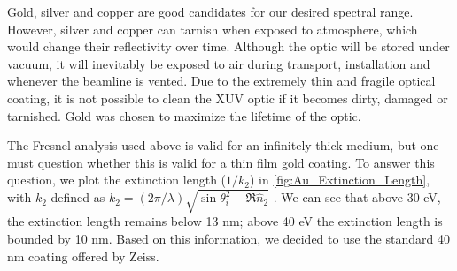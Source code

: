 Gold, silver and copper are good candidates for our desired spectral range. However, silver and copper can tarnish when exposed to atmosphere, which would change their reflectivity over time. Although the optic will be stored under vacuum, it will inevitably be exposed to air during transport, installation and whenever the beamline is vented. Due to the extremely thin and fragile optical coating, it is not possible to clean the XUV optic if it becomes dirty, damaged or tarnished. Gold was chosen to maximize the lifetime of the optic.

The Fresnel analysis used above is valid for an infinitely thick medium, but one must question whether this is valid for a thin film gold coating. To answer this question, we plot the extinction length ($1/k_2$) in \cref{fig:Au_Extinction_Length}, with $k_2$ defined as ${ k_2 = \left( 2 \pi / \lambda \right) \sqrt{ \sin \theta_i^2 - \Re\hat{n}_2} }$ \cite{zangwillModernElectrodynamics2013}. We can see that above 30 eV, the extinction length remains below 13 nm; above 40 eV the extinction length is bounded by 10 nm. Based on this information, we decided to use the standard 40 nm coating offered by Zeiss.

